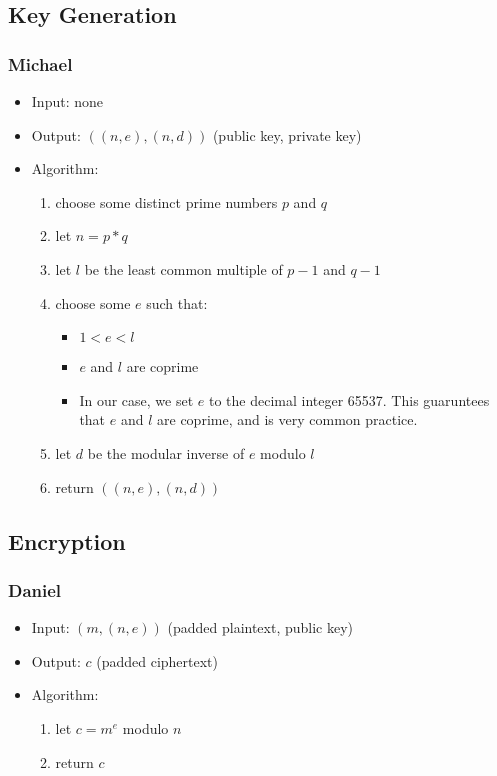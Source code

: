 
\subsection{Key Generation}

\begin{frame}
\frametitle{Michael}
\begin{itemize}
\item Input: none
\item Output: $((n, e), (n, d))$ (public key, private key)
\item Algorithm:
  \begin{enumerate}
  \item choose some distinct prime numbers $p$ and $q$
  \item let $n = p * q$
  \item let $l$ be the least common multiple of
    $p - 1$ and $q - 1$
  \item choose some $e$ such that:
  \begin{itemize}
    \item $1 < e < l$
    \item $e$ and $l$ are coprime
    \item In our case, we set $e$ to the decimal integer
      65537. This guaruntees that $e$ and $l$ are coprime,
      and is very common practice.
  \end{itemize}
  \item let $d$ be the modular inverse of $e$
    modulo $l$
  \item return $((n, e), (n, d))$
  \end{enumerate}
\end{itemize}
\end{frame}


\subsection{Encryption}

\begin{frame}
\frametitle{Daniel}
\begin{itemize}
\item Input: $(m, (n, e))$ (padded plaintext, public key)
\item Output: $c$ (padded ciphertext)
\item Algorithm:
  \begin{enumerate}
  \item let $c = m^e$ modulo $n$
  \item return $c$
  \end{enumerate}
\end{itemize}
\end{frame}

